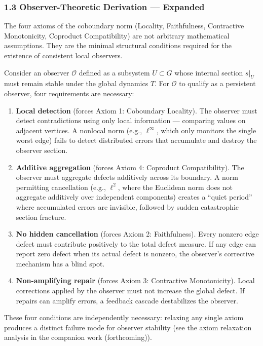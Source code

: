 \documentclass[
]{article}
\begin{document}
\subsubsection{1.3 Observer-Theoretic Derivation ---
Expanded}\label{observer-theoretic-derivation-expanded}

The four axioms of the coboundary norm (Locality, Faithfulness,
Contractive Monotonicity, Coproduct Compatibility) are not arbitrary
mathematical assumptions. They are the minimal structural conditions
required for the existence of consistent local observers.

Consider an observer \(\mathcal{O}\) defined as a subsystem
\(U \subset G\) whose internal section \(s|_U\) must remain stable under
the global dynamics \(T\). For \(\mathcal{O}\) to qualify as a
persistent observer, four requirements are necessary:

\begin{enumerate}
\def\labelenumi{\arabic{enumi}.}
\item
  \textbf{Local detection} (forces Axiom 1: Coboundary Locality). The
  observer must detect contradictions using only local information ---
  comparing values on adjacent vertices. A nonlocal norm (e.g.,
  \(\ell^\infty\), which only monitors the single worst edge) fails to
  detect distributed errors that accumulate and destroy the observer
  section.
\item
  \textbf{Additive aggregation} (forces Axiom 4: Coproduct
  Compatibility). The observer must aggregate defects additively across
  its boundary. A norm permitting cancellation (e.g., \(\ell^2\), where
  the Euclidean norm does not aggregate additively over independent
  components) creates a ``quiet period'' where accumulated errors are
  invisible, followed by sudden catastrophic section fracture.
\item
  \textbf{No hidden cancellation} (forces Axiom 2: Faithfulness). Every
  nonzero edge defect must contribute positively to the total defect
  measure. If any edge can report zero defect when its actual defect is
  nonzero, the observer's corrective mechanism has a blind spot.
\item
  \textbf{Non-amplifying repair} (forces Axiom 3: Contractive
  Monotonicity). Local corrections applied by the observer must not
  increase the global defect. If repairs can amplify errors, a feedback
  cascade destabilizes the observer.
\end{enumerate}

These four conditions are independently necessary: relaxing any single
axiom produces a distinct failure mode for observer stability (see the
axiom relaxation analysis in the companion work (forthcoming)).
\end{document}
